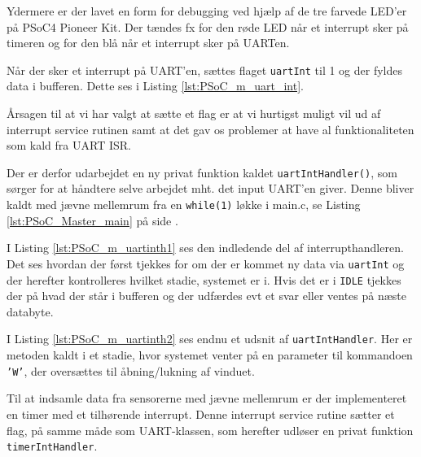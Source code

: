 Ydermere er der lavet en form for debugging ved hjælp af de tre farvede LED'er på PSoC4 Pioneer Kit. 
Der tændes fx for den røde LED når et interrupt sker på timeren og for den blå når et interrupt sker på UARTen.

Når der sker et interrupt på UART'en, sættes flaget \texttt{uartInt} til 1 og der fyldes data i bufferen. Dette ses i Listing \ref{lst:PSoC_m_uart_int}.



Årsagen til at vi har valgt at sætte et flag er at vi hurtigst muligt vil ud af interrupt service rutinen samt at det gav os problemer at have al funktionaliteten som kald fra UART ISR.

Der er derfor udarbejdet en ny privat funktion kaldet \texttt{uartIntHandler()}, 
som sørger for at håndtere selve arbejdet mht. det input UART'en giver. 
Denne bliver kaldt med jævne mellemrum fra en \texttt{while(1)} løkke i main.c, se Listing \ref{lst:PSoC_Master_main} på side \pageref{lst:PSoC_Master_main}.



I Listing \ref{lst:PSoC_m_uartinth1} ses den indledende del af interrupthandleren. Det ses hvordan der først tjekkes for om der er kommet ny data via \texttt{uartInt} og der herefter kontrolleres hvilket stadie, systemet er i. Hvis det er i \texttt{IDLE} tjekkes der på hvad der står i bufferen og der udfærdes evt et svar eller ventes på næste databyte.



I Listing \ref{lst:PSoC_m_uartinth2} ses endnu et udsnit af \texttt{uartIntHandler}. Her er metoden kaldt i et stadie, hvor systemet venter på en parameter til kommandoen \texttt{'W'}, der oversættes til åbning/lukning af vinduet.

\mbox{}

Til at indsamle data fra sensorerne med jævne mellemrum er der implementeret en timer med et tilhørende interrupt. 
Denne interrupt service rutine sætter et flag, på samme måde som UART-klassen, som herefter udløser en privat funktion \texttt{timerIntHandler}.


